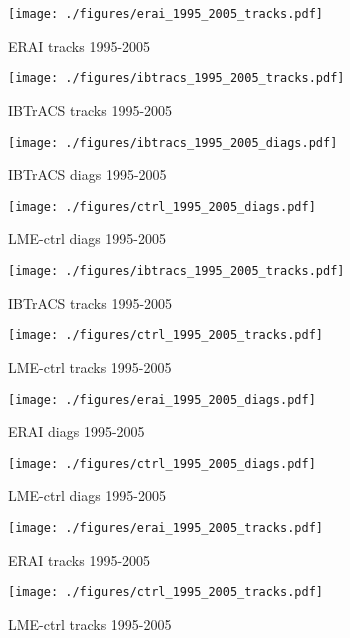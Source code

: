 \begin{figure}[!tbp]
\centering
\begin{minipage}[b]{0.45\textwidth}
\texttt{[image: ./figures/erai\_1995\_2005\_tracks.pdf]}
\caption{ERAI tracks 1995-2005}
\end{minipage}
\hfill
\begin{minipage}[b]{0.45\textwidth}
\texttt{[image: ./figures/ibtracs\_1995\_2005\_tracks.pdf]}
\caption{IBTrACS tracks 1995-2005}
\end{minipage}
\end{figure}

\begin{figure}[!tbp]
\centering
\begin{minipage}[b]{0.45\textwidth}
\texttt{[image: ./figures/ibtracs\_1995\_2005\_diags.pdf]}
\caption{IBTrACS diags 1995-2005}
\end{minipage}
\hfill
\begin{minipage}[b]{0.45\textwidth}
\texttt{[image: ./figures/ctrl\_1995\_2005\_diags.pdf]}
\caption{LME-ctrl diags 1995-2005}
\end{minipage}
\end{figure}

\begin{figure}[!tbp]
\centering
\begin{minipage}[b]{0.45\textwidth}
\texttt{[image: ./figures/ibtracs\_1995\_2005\_tracks.pdf]}
\caption{IBTrACS tracks 1995-2005}
\end{minipage}
\hfill
\begin{minipage}[b]{0.45\textwidth}
\texttt{[image: ./figures/ctrl\_1995\_2005\_tracks.pdf]}
\caption{LME-ctrl tracks 1995-2005}
\end{minipage}
\end{figure}

\begin{figure}[!tbp]
\centering
\begin{minipage}[b]{0.45\textwidth}
\texttt{[image: ./figures/erai\_1995\_2005\_diags.pdf]}
\caption{ERAI diags 1995-2005}
\end{minipage}
\hfill
\begin{minipage}[b]{0.45\textwidth}
\texttt{[image: ./figures/ctrl\_1995\_2005\_diags.pdf]}
\caption{LME-ctrl diags 1995-2005}
\end{minipage}
\end{figure}

\begin{figure}[!tbp]
\centering
\begin{minipage}[b]{0.45\textwidth}
\texttt{[image: ./figures/erai\_1995\_2005\_tracks.pdf]}
\caption{ERAI tracks 1995-2005}
\end{minipage}
\hfill
\begin{minipage}[b]{0.45\textwidth}
\texttt{[image: ./figures/ctrl\_1995\_2005\_tracks.pdf]}
\caption{LME-ctrl tracks 1995-2005}
\end{minipage}
\end{figure}

